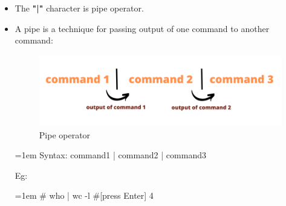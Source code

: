 \setlength{\columnsep}{3pt}
\begin{flushleft}
	\begin{itemize}
		\item The \textbf{"|"} character is pipe operator.
		\item A pipe is a technique for passing output of one command to another command:
		\bigskip
		\bigskip
		\begin{figure}[h!]
			\centering
			\includegraphics[scale=0.5]{content/chapter7/images/pipe.png}
			\caption{Pipe operator}
			\label{fig:pipe_operator}
		\end{figure}

		\bigskip
		\begin{tcolorbox}[breakable,notitle,boxrule=0pt,colback=pink,colframe=pink]
			\color{black}
			\font=1em
			Syntax: command1 | command2 | command3
			\font=4pt
		\end{tcolorbox}
	
		Eg: 
		\bigskip
		\begin{tcolorbox}[breakable,notitle,boxrule=-0pt,colback=black,colframe=black]
			\color{green}
			\font=1em
			\# who | wc -l 			\color{yellow}#[press Enter]
			\newline
			\color{white}
			4
			\font=4pt
		\end{tcolorbox}
		
		
	\end{itemize}
	
	
	
\end{flushleft}

\newpage

